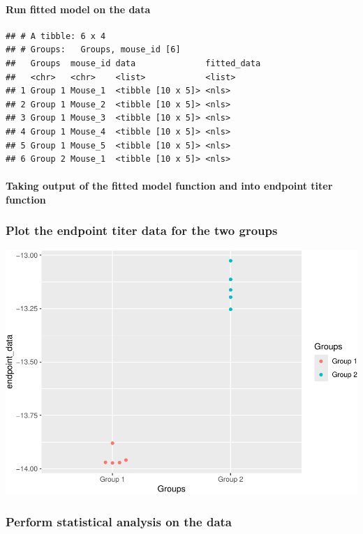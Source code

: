 \documentclass[
]{book}
\begin{document}
\paragraph{Run fitted model on the data}\label{run-fitted-model-on-the-data}

\begin{verbatim}
## # A tibble: 6 x 4
## # Groups:   Groups, mouse_id [6]
##   Groups  mouse_id data              fitted_data
##   <chr>   <chr>    <list>            <list>     
## 1 Group 1 Mouse_1  <tibble [10 x 5]> <nls>      
## 2 Group 1 Mouse_2  <tibble [10 x 5]> <nls>      
## 3 Group 1 Mouse_3  <tibble [10 x 5]> <nls>      
## 4 Group 1 Mouse_4  <tibble [10 x 5]> <nls>      
## 5 Group 1 Mouse_5  <tibble [10 x 5]> <nls>      
## 6 Group 2 Mouse_1  <tibble [10 x 5]> <nls>
\end{verbatim}

\paragraph{Taking output of the fitted model function and into endpoint titer function}\label{taking-output-of-the-fitted-model-function-and-into-endpoint-titer-function}

\subsubsection{Plot the endpoint titer data for the two groups}\label{plot-the-endpoint-titer-data-for-the-two-groups}

\includegraphics{csu-impactb_files/figure-latex/unnamed-chunk-58-1.pdf}

\subsubsection{Perform statistical analysis on the data}\label{perform-statistical-analysis-on-the-data}
\end{document}
